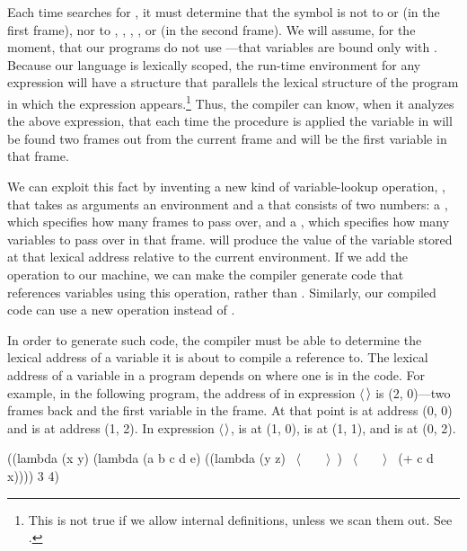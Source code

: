 \noindent
Each time  searches for , it must determine
that the symbol  is not  to  or  (in the
first frame), nor to , , , , or  (in
the second frame).  We will assume, for the moment, that our programs do not
use ---that variables are bound only with .  Because
our language is lexically scoped, the run-time environment for any expression
will have a structure that parallels the lexical structure of the program in
which the expression appears.\footnote{This is not true if we allow internal
definitions, unless we scan them out.  See .  } Thus, the
compiler can know, when it analyzes the above expression, that each time the
procedure is applied the variable  in  will be found
two frames out from the current frame and will be the first variable in that
frame.

We can exploit this fact by inventing a new kind of variable-lookup operation,
, that takes as arguments an environment and a
 that consists of two numbers: a , which specifies how many frames to pass over, and a
, which specifies how many variables to pass over
in that frame.   will produce the value of the
variable stored at that lexical address relative to the current environment.
If we add the  operation to our machine, we can
make the compiler generate code that references variables using this operation,
rather than .  Similarly, our compiled code can use
a new   operation instead of
.

In order to generate such code, the compiler must be able to determine the
lexical address of a variable it is about to compile a reference to.  The
lexical address of a variable in a program depends on where one is in the code.
For example, in the following program, the address of  in expression
\( \langle \)\( \kern0.08em\rangle \) is (2, 0)---two frames back and the first variable in the frame.  At
that point  is at address (0, 0) and  is at address (1, 2).  In
expression \( \langle \)\( \kern0.09em\rangle \),  is at (1, 0),  is at (1, 1), and 
is at (0, 2).

\begin{codeBlock}
((lambda (x y)
   (lambda (a b c d e)
     ((lambda (y z) ~\(\langle \)~~~~\(\rangle \)~)
      ~\(\langle \)~~~~\(\rangle \)~
      (+ c d x))))
 3
 4)
\end{codeBlock}

